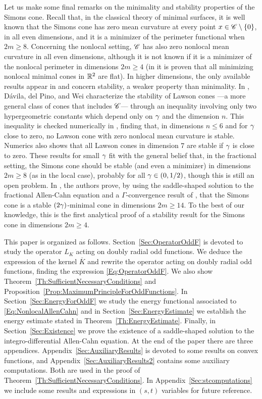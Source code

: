 Let us make some final remarks on the minimality and stability properties of the Simons cone. Recall that, in the classical theory of minimal surfaces, it is well known that the Simons cone has zero mean curvature at every point $x\in \mathscr{C} \setminus \{0\}$, in all even dimensions, and it is a minimizer of the perimeter functional when $2m\geq 8$. Concerning the nonlocal setting, $\mathscr{C}$ has also zero nonlocal mean curvature in all even dimensions, although it is not known if it is a minimizer of the nonlocal perimeter in dimensions $2m\geq 4$ (in \cite{SavinValdinoci-Cones} it is proven that all minimizing nonlocal minimal cones in $\mathbb{R}^2$ are flat). In higher dimensions, the only available results appear in \cite{DaviladelPinoWei, Felipe-Sanz-Perela:SaddleFractional} and concern stability, a weaker property than minimality. In \cite{DaviladelPinoWei},  Dávila, del Pino, and Wei characterize the stability of Lawson cones ---a more general class of cones that includes $\mathscr{C}$--- through an inequality involving only two hypergeometric constants which depend only on $\gamma$ and the dimension $n$. This inequality is checked numerically in \cite{DaviladelPinoWei}, finding that, in dimensions $n \leq 6$ and for $\gamma$ close to zero, no Lawson cone with zero nonlocal mean curvature is stable. Numerics also shows that all Lawson cones in dimension $7$ are stable if $\gamma$ is close to zero. These results for small $\gamma$ fit with the general belief that, in the fractional setting, the Simons cone should be stable (and even a minimizer) in dimensions $2m \geq 8$ (as in the local case), probably for all $\gamma\in(0,1/2)$, though this is still an open problem. In \cite{Felipe-Sanz-Perela:SaddleFractional}, the authors prove, by using the saddle-shaped solution to the fractional Allen-Cahn equation and a $\Gamma$-convergence result of \cite{CabreCintiSerra-Stable}, that the Simons cone is a stable $(2\gamma)$-minimal cone in dimensions $2m\geq 14$. To the best of our knowledge, this is the first analytical proof of a stability result for the Simons cone in dimensions $2m \geq 4$.

This paper is organized as follows. Section~\ref{Sec:OperatorOddF} is devoted to study the operator $L_K$ acting on doubly radial odd functions. We deduce the expression of the kernel $\overline{K}$ and rewrite the operator acting on doubly radial odd functions, finding the expression \eqref{Eq:OperatorOddF}. We also show Theorem~\ref{Th:SufficientNecessaryConditions} and Proposition~\ref{Prop:MaximumPrincipleForOddFunctions}. In Section~\ref{Sec:EnergyForOddF} we study the energy functional associated to \eqref{Eq:NonlocalAllenCahn} and in Section~\ref{Sec:EnergyEstimate} we establish the energy estimate stated in Theorem~\ref{Th:EnergyEstimate}. Finally, in Section~\ref{Sec:Existence} we prove the existence of a saddle-shaped solution to the integro-differential Allen-Cahn equation. At the end of the paper there are three appendices. Appendix~\ref{Sec:AuxiliaryResults} is devoted to some results on convex functions, and Appendix~\ref{Sec:AuxiliaryResults2} contains some auxiliary computations. Both are used in the proof of Theorem~\ref{Th:SufficientNecessaryConditions}. In Appendix~\ref{Sec:stcomputations} we include some results and expressions in $(s,t)$ variables for future reference.